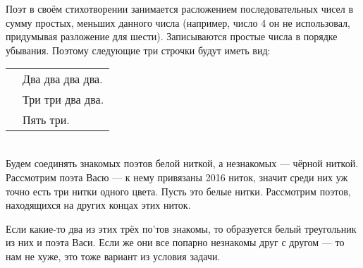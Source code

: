 \begin{itemize}

\itA
Поэт в своём стихотворении занимается расложением последовательных чисел в сумму простых, меньших данного числа (например, число 4 он не использовал, придумывая разложение для шести). Записываются простые числа в порядке убывания. Поэтому следующие три строчки будут иметь вид: \\
\begin{tabular}{ll}
\qquad & Два два два два. \\
& Три три два два. \\
& Пять три.
\end{tabular}


\itB $\phantom{x}$
\vspace{-0.5cm}
\begin{center}\end{center}
\vspace{0.2cm}

\itC Будем соединять знакомых поэтов белой ниткой, а незнакомых — чёрной ниткой. Рассмотрим поэта Васю — к нему привязаны 2016 ниток, значит среди них уж точно есть три нитки одного цвета. Пусть это белые нитки. Рассмотрим поэтов, находящихся на других концах этих ниток.

Если какие-то два из этих трёх по'тов знакомы, то образуется белый треугольник из них и поэта Васи. Если же они все попарно незнакомы друг с другом — то нам не хуже, это тоже вариант из условия задачи.
\end{itemize}